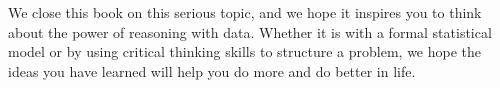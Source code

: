 


We close this book on this serious topic,
and we hope it inspires you to think about
the power of reasoning with data.
Whether it is with a formal statistical model
or by using critical thinking skills to structure
a problem, we hope the ideas you have learned will
help you do more and do better in life.



{}

